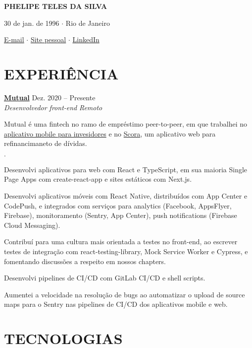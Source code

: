 \documentclass[12pt]{article}
\newenvironment{tightlist}
  {\begin{list}
    {$\cdot$}
    {
      \setlength{\leftmargin}{0em}
      \setlength{\itemsep}{\smallskipamount}
    }
  }
{\end{list}}
\begin{document}
\pagestyle{empty}

\centerline{\huge\bf PHELIPE TELES DA SILVA}
\medskip

\centerline{30 de jan. de 1996 $\cdot$ Rio de Janeiro}
\smallskip

\centerline{
  \href{mailto:telesphelipe@gmail.com}{E-mail}
  $\cdot$
  \href{https://phelipetls.github.io}{Site pessoal}
  $\cdot$
  \href{https://linkedin.com/in/phelipeteles}{LinkedIn}
}
\smallskip

\section*{EXPERIÊNCIA}

\textbf{\href{https://mutual.club}{Mutual}} \hfill Dez. 2020 -- Presente \\
\textit{Desenvolvedor front-end} \hfill \textit{Remoto} {\parfillskip=0pt\par}

Mutual é uma fintech no ramo de empréstimo peer-to-peer, em que trabalhei no
\href{https://mutual.club/en/invest.html}{aplicativo mobile para invesidores} e
no \href{https://scora.com.br/}{Scora}, um aplicativo web para refinancimaneto
de dívidas.

\begin{tightlist}
  \item Desenvolvi aplicativos para web com React e TypeScript, em sua maioria
    Single Page Apps com create-react-app e sites estáticos com Next.js.
  \item Desenvolvi aplicativos móveis com React Native, distribuídos com App
    Center e CodePush, e integrados com serviços para analytics (Facebook,
    AppsFlyer, Firebase), monitoramento (Sentry, App Center), push notifications
    (Firebase Cloud Messaging).
  \item Contribuí para uma cultura mais orientada a testes no front-end, ao
    escrever testes de integração com react-testing-library, Mock Service Worker
    e Cypress, e fomentando discussões a respeito em nossos chapters.
  \item Desenvolvi pipelines de CI/CD com GitLab CI/CD e shell scripts.
  \item Aumentei a velocidade na resolução de bugs ao automatizar o upload de
    source maps para o Sentry nas pipelines de CI/CD dos aplicativos mobile e
    web.
\end{tightlist}

\section*{TECNOLOGIAS}
\end{document}
